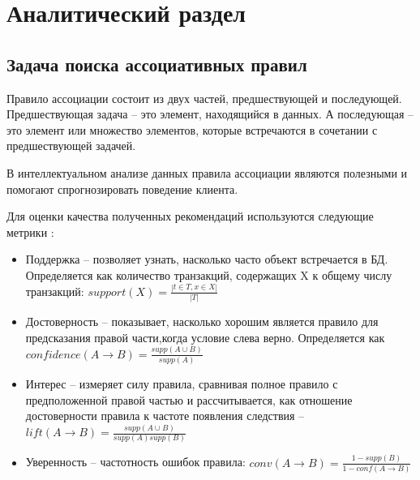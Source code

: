 \documentclass[12pt]{report}
\begin{document}
\pagebreak

\chapter{Аналитический раздел}

\section{Задача поиска ассоциативных правил}

Правило ассоциации состоит из двух частей, предшествующей и последующей. Предшествующая задача -- это элемент, находящийся в данных. А последующая -- это элемент или множество элементов, которые встречаются в сочетании с предшествующей задачей. \cite{sr1}

В интеллектуальном анализе данных правила ассоциации являются полезными и помогают спрогнозировать поведение клиента.

Для оценки качества полученных рекомендаций используются следующие метрики \cite{sr1}:

\begin{itemize}
	\item Поддержка -- позволяет узнать, насколько часто объект встречается в БД. Определяется как количество транзакций, содержащих X к общему числу транзакций: $support(X) = \frac{|t \in T, x \in X |}{|T|}$
	\item Достоверность -- показывает, насколько хорошим является правило для предсказания правой части,когда условие слева верно. Определяется как $confidence(A \rightarrow B) = \frac{supp(A \cup B)}{supp(A)}$
	\item Интерес -- измеряет силу правила, сравнивая полное правило с предположенной правой частью и рассчитывается, как отношение достоверности правила к частоте появления следствия -- $lift(A \rightarrow B) = \frac{supp(A \cup B)}{supp(A)supp(B)}$
    \item Уверенность -- частотность ошибок правила: $conv(A \rightarrow B) = \frac{1 - supp(B)}{1 -conf(A \rightarrow B)}$
\end{itemize}
\end{document}
